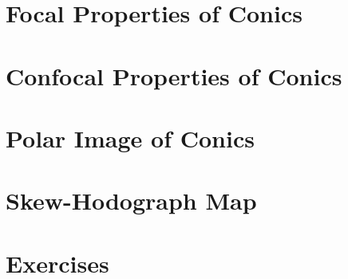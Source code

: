 \section{Focal Properties of Conics}
\label{sec:09-focal}


\section{Confocal Properties of Conics}
\label{sec:09-confocal}


\section{Polar Image of Conics}
\label{sec:09-polarimage}


\section{Skew-Hodograph Map}
\label{sec:09-hodograph}


\section{Exercises}
\label{sec:09-exercises}
